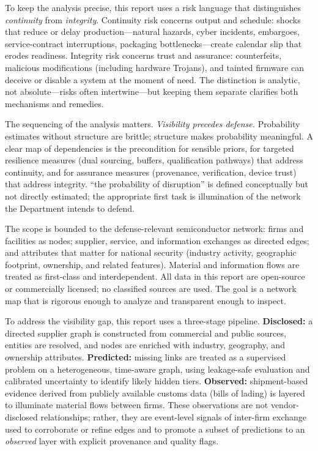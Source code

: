 To keep the analysis precise, this report uses a risk language that distinguishes \emph{continuity} from \emph{integrity}. Continuity risk concerns output and schedule: shocks that reduce or delay production---natural hazards, cyber incidents, embargoes, service-contract interruptions, packaging bottlenecks---create calendar slip that erodes readiness. Integrity risk concerns trust and assurance: counterfeits, malicious modifications (including hardware Trojans), and tainted firmware can deceive or disable a system at the moment of need. The distinction is analytic, not absolute---risks often intertwine---but keeping them separate clarifies both mechanisms and remedies.

The sequencing of the analysis matters. \emph{Visibility precedes defense.} Probability estimates without structure are brittle; structure makes probability meaningful. A clear map of dependencies is the precondition for sensible priors, for targeted resilience measures (dual sourcing, buffers, qualification pathways) that address continuity, and for assurance measures (provenance, verification, device trust) that address integrity. ``the probability of disruption'' is defined conceptually but not directly estimated; the appropriate first task is illumination of the network the Department intends to defend.

The scope is bounded to the defense-relevant semiconductor network: firms and facilities as nodes; supplier, service, and information exchanges as directed edges; and attributes that matter for national security (industry activity, geographic footprint, ownership, and related features). Material and information flows are treated as first-class and interdependent. All data in this report are open-source or commercially licensed; no classified sources are used. The goal is a network map that is rigorous enough to analyze and transparent enough to inspect.

To address the visibility gap, this report uses a three-stage pipeline. \textbf{Disclosed:} a directed supplier graph is constructed from commercial and public sources, entities are resolved, and nodes are enriched with industry, geography, and ownership attributes. \textbf{Predicted:} missing links are treated as a supervised problem on a heterogeneous, time-aware graph, using leakage-safe evaluation and calibrated uncertainty to identify likely hidden tiers. \textbf{Observed:} shipment-based evidence derived from publicly available customs data (bills of lading) is layered to illuminate material flows between firms. These observations are not vendor-disclosed relationships; rather, they are event-level signals of inter-firm exchange used to corroborate or refine edges and to promote a subset of predictions to an \emph{observed} layer with explicit provenance and quality flags.

